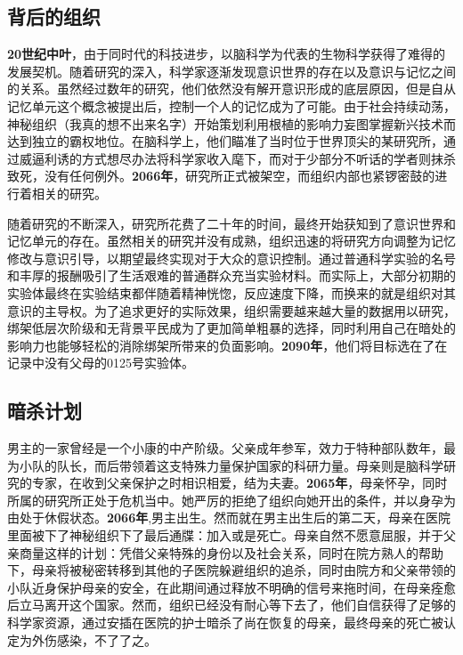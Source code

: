 \documentclass[12pt, a4paper]{article}
\begin{document}
    \subsection*{背后的组织}

    \textbf{20世纪中叶}，由于同时代的科技进步，以脑科学为代表的生物科学获得了难得的发展契机。随着研究的深入，科学家逐渐发现意识世界的存在以及意识与记忆之间的关系。虽然经过数年的研究，他们依然没有解开意识形成的底层原因，但是自从记忆单元这个概念被提出后，控制一个人的记忆成为了可能。由于社会持续动荡，神秘组织（我真的想不出来名字）开始策划利用根植的影响力妄图掌握新兴技术而达到独立的霸权地位。在脑科学上，他们瞄准了当时位于世界顶尖的某研究所，通过威逼利诱的方式想尽办法将科学家收入麾下，而对于少部分不听话的学者则抹杀致死，没有任何例外。\textbf{2066年}，研究所正式被架空，而组织内部也紧锣密鼓的进行着相关的研究。

    随着研究的不断深入，研究所花费了二十年的时间，最终开始获知到了意识世界和记忆单元的存在。虽然相关的研究并没有成熟，组织迅速的将研究方向调整为记忆修改与意识引导，以期望最终实现对于大众的意识控制。通过普通科学实验的名号和丰厚的报酬吸引了生活艰难的普通群众充当实验材料。而实际上，大部分初期的实验体最终在实验结束都伴随着精神恍惚，反应速度下降，而换来的就是组织对其意识的主导权。为了追求更好的实际效果，组织需要越来越大量的数据用以研究，绑架低层次阶级和无背景平民成为了更加简单粗暴的选择，同时利用自己在暗处的影响力也能够轻松的消除绑架所带来的负面影响。\textbf{2090年}，他们将目标选在了在记录中没有父母的0125号实验体。

    \subsection*{暗杀计划}
        
    男主的一家曾经是一个小康的中产阶级。父亲成年参军，效力于特种部队数年，最为小队的队长，而后带领着这支特殊力量保护国家的科研力量。母亲则是脑科学研究的专家，在收到父亲保护之时相识相爱，结为夫妻。\textbf{2065年}，母亲怀孕，同时所属的研究所正处于危机当中。她严厉的拒绝了组织向她开出的条件，并以身孕为由处于休假状态。\textbf{2066年},男主出生。然而就在男主出生后的第二天，母亲在医院里面被下了神秘组织下了最后通牒：加入或是死亡。母亲自然不愿意屈服，并于父亲商量这样的计划：凭借父亲特殊的身份以及社会关系，同时在院方熟人的帮助下，母亲将被秘密转移到其他的子医院躲避组织的追杀，同时由院方和父亲带领的小队近身保护母亲的安全，在此期间通过释放不明确的信号来拖时间，在母亲痊愈后立马离开这个国家。然而，组织已经没有耐心等下去了，他们自信获得了足够的科学家资源，通过安插在医院的护士暗杀了尚在恢复的母亲，最终母亲的死亡被认定为外伤感染，不了了之。
\end{document}
